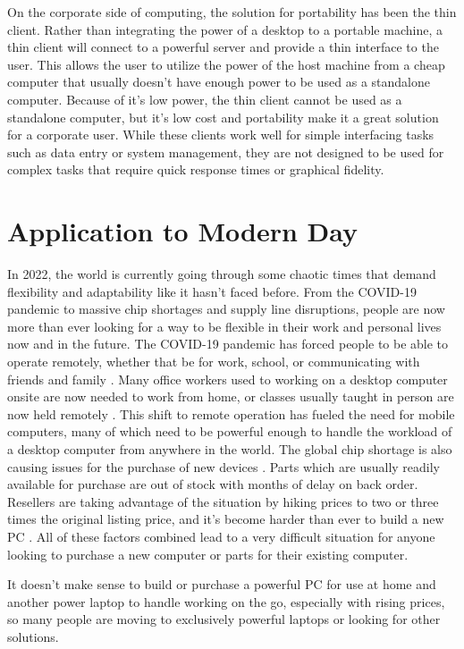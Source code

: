 On the corporate side of computing, the solution for portability has been the thin client.
Rather than integrating the power of a desktop to a portable machine, a thin client will connect to a powerful server and provide a thin interface to the user.
This allows the user to utilize the power of the host machine from a cheap computer that usually doesn't have enough power to be used as a standalone computer.
Because of it's low power, the thin client cannot be used as a standalone computer, but it's low cost and portability make it a great solution for a corporate user.
While these clients work well for simple interfacing tasks such as data entry or system management, they are not designed to be used for complex tasks that require quick response times or graphical fidelity.


\section{Application to Modern Day}\label{ApplicationToModernDay}

In 2022, the world is currently going through some chaotic times that demand flexibility and adaptability like it hasn't faced before.
From the COVID-19 pandemic to massive chip shortages and supply line disruptions, people are now more than ever looking for a way to be flexible in their work and personal lives now and in the future.
The COVID-19 pandemic has forced people to be able to operate remotely, whether that be for work, school, or communicating with friends and family \cite{levanon_2020}.
Many office workers used to working on a desktop computer onsite are now needed to work from home, or classes usually taught in person are now held remotely \cite{ASU_covid_19}.
This shift to remote operation has fueled the need for mobile computers, many of which need to be powerful enough to handle the workload of a desktop computer from anywhere in the world.
The global chip shortage is also causing issues for the purchase of new devices \cite{chipshortage_jpmorgan}.
Parts which are usually readily available for purchase are out of stock with months of delay on back order.
Resellers are taking advantage of the situation by hiking prices to two or three times the original listing price, and it's become harder than ever to build a new PC \cite{tamarov_2021}.
All of these factors combined lead to a very difficult situation for anyone looking to purchase a new computer or parts for their existing computer.

It doesn't make sense to build or purchase a powerful PC for use at home and another power laptop to handle working on the go, especially with rising prices, so many people are moving to exclusively powerful laptops or looking for other solutions.

